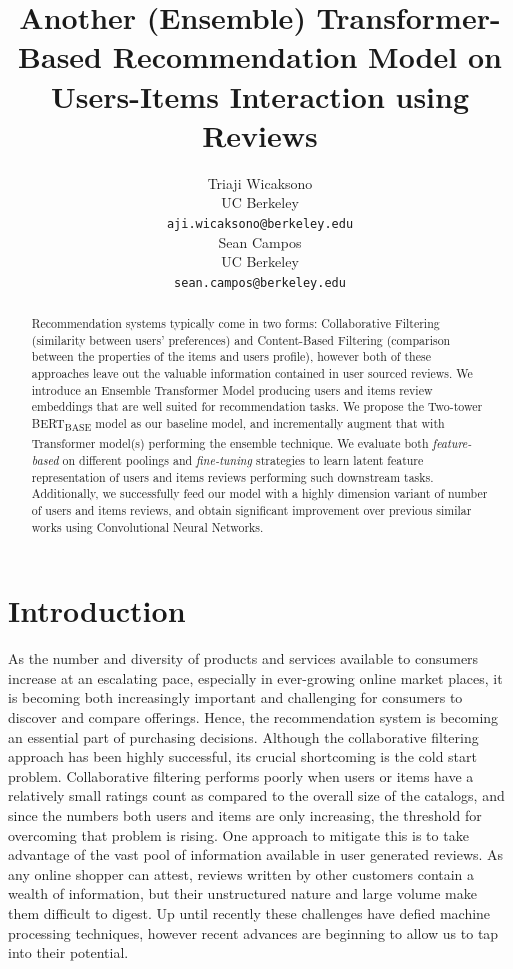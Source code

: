 \documentclass[11pt,a4paper]{article}
\title{Another (Ensemble) Transformer-Based Recommendation Model on Users-Items Interaction using Reviews}
\author{Triaji Wicaksono \\
  UC Berkeley \\
  \texttt{aji.wicaksono@berkeley.edu} \\\And
  Sean Campos \\
  UC Berkeley \\
  \texttt{sean.campos@berkeley.edu} \\}
\date{}
\begin{document}
\maketitle
\begin{abstract}
Recommendation systems typically come in two forms: Collaborative Filtering (similarity between users' preferences) and Content-Based Filtering (comparison between the properties of the items and users profile), however both of these approaches leave out the valuable information contained in user sourced reviews. We introduce an Ensemble Transformer Model producing users and items review embeddings that are well suited for recommendation tasks. We propose the Two-tower BERT\textsubscript{BASE} model as our baseline model, and incrementally augment that with Transformer model(s) performing the ensemble technique\footnotemark. We evaluate both \emph{feature-based} on different poolings and \emph{fine-tuning} strategies to learn latent feature representation of users and items reviews performing such downstream tasks. Additionally, we successfully feed our model with a highly dimension variant of number of users and items reviews, and obtain significant improvement over previous similar works using Convolutional Neural Networks.

\end{abstract}

\section{Introduction}

As the number and diversity of products and services available to consumers increase at an escalating pace, especially in ever-growing online market places, it is becoming both increasingly important and challenging for consumers to discover and compare offerings. Hence, the recommendation system is becoming an essential part of purchasing decisions. Although the collaborative filtering approach has been highly successful, its crucial shortcoming is the cold start problem.  Collaborative filtering performs poorly when users or items have a relatively small ratings count as compared to the overall size of the catalogs, and since the numbers both users and items are only increasing, the threshold for overcoming that problem is rising.  One approach to mitigate this is to take advantage of the vast pool of information available in user generated reviews. As any online shopper can attest, reviews written by other customers contain a wealth of information, but their unstructured nature and large volume make them difficult to digest.  Up until recently these challenges have defied machine processing techniques, however recent advances are beginning to allow us to tap into their potential. 
\end{document}
